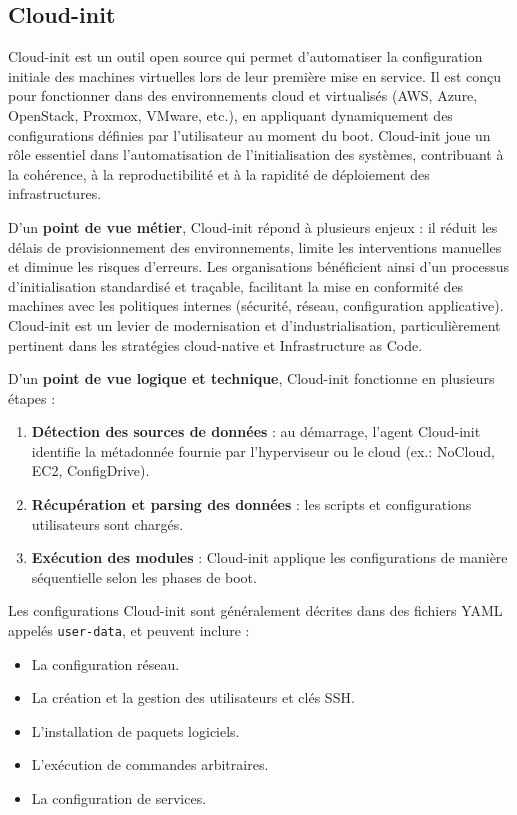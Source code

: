 \subsection{Cloud-init}

Cloud-init est un outil open source qui permet d’automatiser la configuration initiale des machines virtuelles lors de leur première mise en service. Il est conçu pour fonctionner dans des environnements cloud et virtualisés (AWS, Azure, OpenStack, Proxmox, VMware, etc.), en appliquant dynamiquement des configurations définies par l’utilisateur au moment du boot. Cloud-init joue un rôle essentiel dans l’automatisation de l’initialisation des systèmes, contribuant à la cohérence, à la reproductibilité et à la rapidité de déploiement des infrastructures.

D’un \textbf{point de vue métier}, Cloud-init répond à plusieurs enjeux  : il réduit les délais de provisionnement des environnements, limite les interventions manuelles et diminue les risques d’erreurs. Les organisations bénéficient ainsi d’un processus d’initialisation standardisé et traçable, facilitant la mise en conformité des machines avec les politiques internes (sécurité, réseau, configuration applicative). Cloud-init est un levier de modernisation et d’industrialisation, particulièrement pertinent dans les stratégies cloud-native et Infrastructure as Code.

D’un \textbf{point de vue logique et technique}, Cloud-init fonctionne en plusieurs étapes :
\begin{enumerate}
	\item \textbf{Détection des sources de données}  : au démarrage, l’agent Cloud-init identifie la métadonnée fournie par l’hyperviseur ou le cloud (ex.: NoCloud, EC2, ConfigDrive).
	\item \textbf{Récupération et parsing des données}  : les scripts et configurations utilisateurs sont chargés.
	\item \textbf{Exécution des modules}  : Cloud-init applique les configurations de manière séquentielle selon les phases de boot.
\end{enumerate}

Les configurations Cloud-init sont généralement décrites dans des fichiers YAML appelés \texttt{user-data}, et peuvent inclure  :
\begin{itemize}
	\item La configuration réseau.
	\item La création et la gestion des utilisateurs et clés SSH.
	\item L’installation de paquets logiciels.
	\item L’exécution de commandes arbitraires.
	\item La configuration de services.
\end{itemize}

